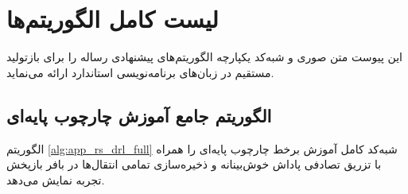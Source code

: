\documentclass[oneside,openany,phd]{TMU-Thesis}
\begin{document}
\newpage

\chapter{لیست کامل الگوریتم‌ها}
\label{chap:appendix_algorithms}

این پیوست متن صوری و شبه‌کد یکپارچه الگوریتم‌های پیشنهادی رساله را برای بازتولید مستقیم در زبان‌های برنامه‌نویسی استاندارد ارائه می‌نماید.

\section{الگوریتم جامع آموزش چارچوب پایه‌ای \texorpdfstring{}{RS-DRL}}
\label{sec:app_algo_rsdrl}

الگوریتم \ref{alg:app_rs_drl_full} شبه‌کد کامل آموزش برخط چارچوب پایه‌ای  را همراه با تزریق تصادفی پاداش خوش‌بینانه و ذخیره‌سازی تمامی انتقال‌ها در بافر بازپخش تجربه نمایش می‌دهد.
\end{document}
